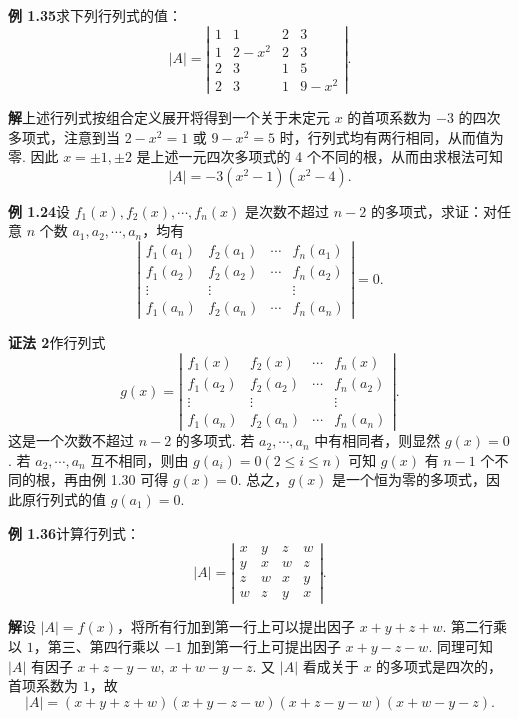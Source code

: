 \documentclass[UTF8, 12pt, fontset=fandol, oneside]{ctexart}
\begin{document}
\noindent\textbf{例 1.35}\quad 求下列行列式的值：
\[
|A|=\left|\begin{array}{cccc}
1 & 1 & 2 & 3\\
1 & 2-x^2 & 2 & 3\\
2 & 3 & 1 & 5\\
2 & 3 & 1 & 9-x^2
\end{array}\right|.
\]

\noindent\textbf{解}\quad 上述行列式按组合定义展开将得到一个关于未定元 $x$ 的首项系数为 $-3$ 的四次多项式，注意到当 $2-x^2=1$ 或 $9-x^2=5$ 时，行列式均有两行相同，从而值为零. 因此 $x=\pm1,\pm2$ 是上述一元四次多项式的 4 个不同的根，从而由求根法可知
\[
|A|=-3(x^2-1)(x^2-4).
\]

\noindent\textbf{例 1.24}\quad 设 $f_1(x),f_2(x),\cdots,f_n(x)$ 是次数不超过 $n-2$ 的多项式，求证：对任意 $n$ 个数 $a_1,a_2,\cdots,a_n$，均有
\[
\left|\begin{array}{cccc}
f_1(a_1) & f_2(a_1) & \cdots & f_n(a_1)\\
f_1(a_2) & f_2(a_2) & \cdots & f_n(a_2)\\
\vdots & \vdots &        & \vdots\\
f_1(a_n) & f_2(a_n) & \cdots & f_n(a_n)
\end{array}\right|=0.
\]

\noindent\textbf{证法 2}\quad 作行列式
\[
g(x)=\left|\begin{array}{cccc}
f_1(x) & f_2(x) & \cdots & f_n(x)\\
f_1(a_2) & f_2(a_2) & \cdots & f_n(a_2)\\
\vdots & \vdots &        & \vdots\\
f_1(a_n) & f_2(a_n) & \cdots & f_n(a_n)
\end{array}\right|.
\]
这是一个次数不超过 $n-2$ 的多项式. 若 $a_2,\cdots,a_n$ 中有相同者，则显然 $g(x)=0$. 若 $a_2,\cdots,a_n$ 互不相同，则由 $g(a_i)=0(2\le i\le n)$ 可知 $g(x)$ 有 $n-1$ 个不同的根，再由例 1.30 可得 $g(x)=0$. 总之，$g(x)$ 是一个恒为零的多项式，因此原行列式的值 $g(a_1)=0$.

\noindent\textbf{例 1.36}\quad 计算行列式：
\[
|A|=\left|\begin{array}{cccc}
x & y & z & w\\
y & x & w & z\\
z & w & x & y\\
w & z & y & x
\end{array}\right|.
\]

\noindent\textbf{解}\quad 设 $|A|=f(x)$，将所有行加到第一行上可以提出因子 $x+y+z+w$. 第二行乘以 $1$，第三、第四行乘以 $-1$ 加到第一行上可提出因子 $x+y-z-w$. 同理可知 $|A|$ 有因子 $x+z-y-w,\ x+w-y-z$. 又 $|A|$ 看成关于 $x$ 的多项式是四次的，首项系数为 $1$，故
\[
|A|=(x+y+z+w)(x+y-z-w)(x+z-y-w)(x+w-y-z).
\]
\end{document}
